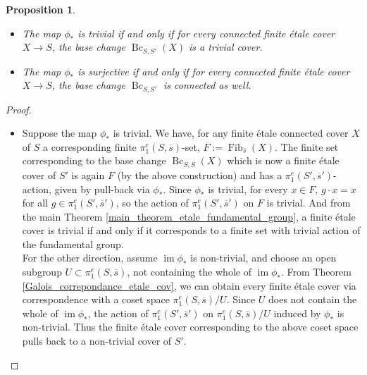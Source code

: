 \documentclass{article}
\theoremstyle{plain}
\newtheorem{proposition}[theorem]{Proposition}
\theoremstyle{definition}
\DeclareMathOperator{\Fib}{Fib}
\DeclareMathOperator{\Bc}{Bc}
\DeclareMathOperator{\im}{im}
\begin{document}
\begin{proposition}
\label{image_base_change_induce}
\textbf{ }
\begin{itemize}
    \item[$a)$] The map $\phi_*$ is trivial if and only if for every connected finite \'etale cover $X\rightarrow S$, the base change $\Bc_{S,S'}(X)$ is a trivial cover.
    \item[$b)$] The map $\phi_*$ is surjective if and only if for every connected finite \'etale cover $X\rightarrow S$, the base change $\Bc_{S,S'}$ is connected as well.
\end{itemize}
\end{proposition}
\begin{proof} \textbf{ }
\begin{itemize}
    \item[$a)$] Suppose the map $\phi_*$ is trivial. 
    We have, for any finite \'etale connected cover $X$ of $S$ a corresponding finite $\pi^e_1(S,\overline{s})$-set, $F:= \Fib_{\overline{s}}(X)$.
    The finite set corresponding to the base change $\Bc_{S,S}(X)$ which is now a finite \'etale cover of $S'$ is again $F$ (by the above construction) and has a $\pi^e_1(S',\overline{s}')$-action, given by pull-back via $\phi_*$.
    Since $\phi_*$ is trivial, for every $x\in F$, $g\cdot x =x$ for all $g\in\pi^e_1(S',\overline{s}')$, so the action of $\pi^e_1(S',\overline{s}')$ on $F$ is trivial.
    And from the main Theorem \ref{main_theorem_etale_fundamental_group}, a finite \'etale cover is trivial if and only if it corresponds to a finite set with trivial action of the fundamental group. \\
    For the other direction, assume $\im \phi_*$ is non-trivial, and choose an open subgroup $U\subset\pi^e_1(S,\overline{s})$, not containing the whole of $\im \phi_*$.
    From Theorem \ref{Galois_correpondance_etale_cov}, we can obtain every finite \'etale cover via correspondence with a coset space $\pi^e_1(S,\overline{s}) / U$.
    Since $U$ does not contain the whole of $\im\phi_*$, the action of $\pi^e_1(S',\overline{s}')$ on $\pi^e_1(S,\overline{s})/U$ induced by $\phi_*$ is non-trivial.
    Thus the finite \'etale cover corresponding to the above coset space pulls back to a non-trivial cover of $S'$.


\end{itemize}
\end{proof}
\end{document}
